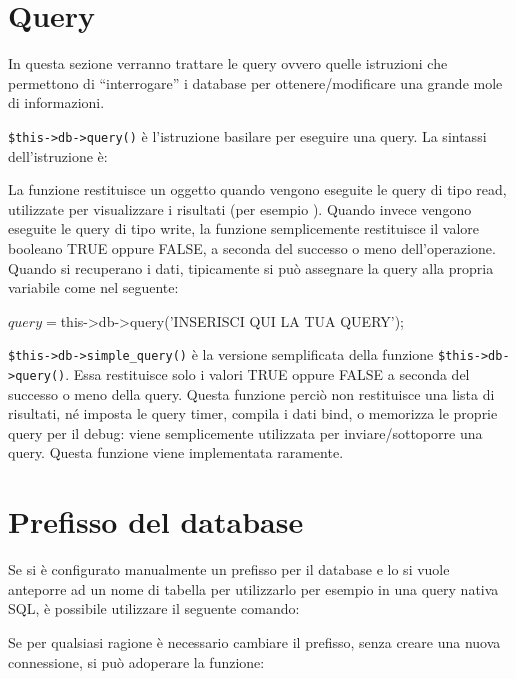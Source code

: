 \section*{Query}
In questa sezione verranno trattare le query ovvero quelle istruzioni che permettono di ``interrogare'' i database per ottenere/modificare una grande mole di informazioni.

\verb|$this->db->query()| è l'istruzione basilare per eseguire una query. La sintassi dell'istruzione è:


La funzione  restituisce un oggetto quando vengono eseguite le query di tipo read, utilizzate per visualizzare i risultati (per esempio ). Quando invece vengono eseguite le query di tipo write, la funzione semplicemente restituisce il valore booleano TRUE oppure FALSE, a seconda del successo o meno dell'operazione. Quando si recuperano i dati, tipicamente si può assegnare la query alla propria variabile come nel seguente:

\begin{code}
$query = $this->db->query('INSERISCI QUI LA TUA QUERY');
\end{code}

\verb|$this->db->simple_query()| è la versione semplificata della funzione \verb|$this->db->query()|. Essa restituisce solo i valori TRUE oppure FALSE a seconda del successo o meno della query. Questa funzione perciò non restituisce una lista di risultati, né imposta le query timer, compila i dati bind, o memorizza le proprie query per il debug: viene semplicemente utilizzata per inviare/sottoporre una query. Questa funzione viene implementata raramente.

\section*{Prefisso del database}
Se si è configurato manualmente un prefisso per il database e lo si vuole anteporre ad un nome di tabella per utilizzarlo per esempio in una query nativa SQL, è possibile utilizzare il seguente comando:


Se per qualsiasi ragione è necessario cambiare il prefisso, senza creare una nuova connessione, si può adoperare la funzione:

